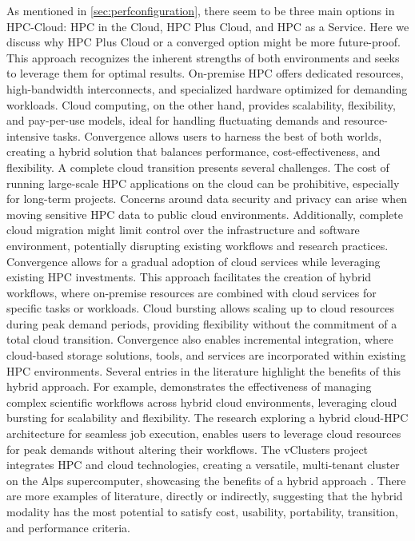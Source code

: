     As mentioned in \autoref{sec:perfconfiguration}, there seem to be three main options in HPC-Cloud: HPC in the Cloud, HPC Plus Cloud, and HPC as a Service. Here we discuss why HPC Plus Cloud or a converged option might be more future-proof. This approach recognizes the inherent strengths of both environments and seeks to leverage them for optimal results.
    On-premise HPC offers dedicated resources, high-bandwidth interconnects, and specialized hardware optimized for demanding workloads. Cloud computing, on the other hand, provides scalability, flexibility, and pay-per-use models, ideal for handling fluctuating demands and resource-intensive tasks. Convergence allows users to harness the best of both worlds, creating a hybrid solution that balances performance, cost-effectiveness, and flexibility.
    A complete cloud transition presents several challenges. The cost of running large-scale HPC applications on the cloud can be prohibitive, especially for long-term projects. Concerns around data security and privacy can arise when moving sensitive HPC data to public cloud environments. Additionally, complete cloud migration might limit control over the infrastructure and software environment, potentially disrupting existing workflows and research practices.
    Convergence allows for a gradual adoption of cloud services while leveraging existing HPC investments. This approach facilitates the creation of hybrid workflows, where on-premise resources are combined with cloud services for specific tasks or workloads. Cloud bursting allows scaling up to cloud resources during peak demand periods, providing flexibility without the commitment of a total cloud transition. Convergence also enables incremental integration, where cloud-based storage solutions, tools, and services are incorporated within existing HPC environments.
    Several entries in the literature highlight the benefits of this hybrid approach. For example, \cite{balis_scientific_2021} demonstrates the effectiveness of managing complex scientific workflows across hybrid cloud environments, leveraging cloud bursting for scalability and flexibility. The research exploring a hybrid cloud-HPC architecture for seamless job execution, \cite{endo_consideration_2022} enables users to leverage cloud resources for peak demands without altering their workflows. The vClusters project integrates HPC and cloud technologies, creating a versatile, multi-tenant cluster on the Alps supercomputer, showcasing the benefits of a hybrid approach \cite{alam_versatile_2023}.
    There are more examples of literature, directly or indirectly, suggesting that the hybrid modality has the most potential to satisfy cost, usability, portability, transition, and performance criteria.



